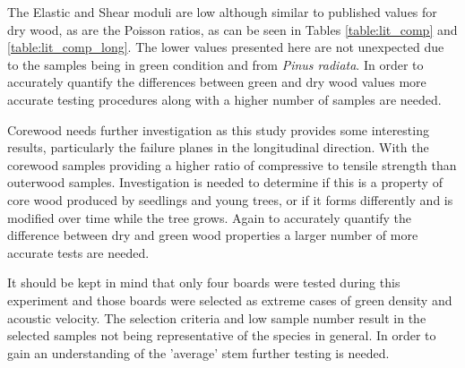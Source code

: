 \documentclass[10pt]{article}
\begin{document}

The Elastic and Shear moduli are low although similar to published values for dry wood, as are the Poisson ratios, as can be seen
in Tables \ref{table:lit_comp} and \ref{table:lit_comp_long}. The lower values presented here are not unexpected due to the samples
being in green condition and from \textit{Pinus radiata}. In order to accurately quantify the differences between green and dry wood
values more accurate testing procedures along with a higher number of samples are needed.

Corewood needs further investigation as this study provides some interesting results, particularly the failure planes in the
longitudinal direction. With the corewood samples providing a higher ratio of compressive to tensile strength than outerwood samples.
Investigation is needed to determine if this is a property of core wood produced by seedlings and young trees, or if it forms
differently and is modified over time while the tree grows. Again to accurately quantify the difference between dry and green wood
properties a larger number of more accurate tests are needed.

It should be kept in mind that only four boards were tested during this experiment and those boards were selected as extreme cases of
green density and acoustic velocity. The selection criteria and low sample number result in the selected samples not being representative
of the species in general. In order to gain an understanding of the 'average' stem further testing is needed.

\end{document}
